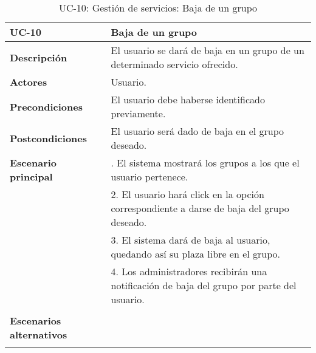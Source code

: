 \begin{table}[H]
  \begin{center}
    \begin{tabularx}{16.4cm}{|l|X|}
      \hline
      \textbf{UC-10} & \textbf{Baja de un grupo}\\
      \hline
      \textbf{Descripción} & El usuario se dará de baja en un grupo de un determinado servicio ofrecido.\\
      \hline
      \textbf{Actores} & Usuario.\\
      \hline
      \textbf{Precondiciones} & El usuario debe haberse identificado previamente.\\
      \hline
      \textbf{Postcondiciones} & El usuario será dado de baja en el grupo deseado.\\
      \hline
      \textbf{Escenario principal} & \smallskip 1. El sistema mostrará los grupos a los que el usuario pertenece.\\
      & 2. El usuario hará click en la opción correspondiente a darse de baja del grupo deseado.\\
      & 3. El sistema dará de baja al usuario, quedando así su plaza libre en el grupo. \\
      & 4. Los administradores recibirán una notificación de baja del grupo por parte del usuario.\\
      & \\
      \hline
      \textbf{Escenarios alternativos} & \\
      & \\
      \hline
    \end{tabularx}
    \caption{UC-10: Gestión de servicios: Baja de un grupo}
  \end{center}
\end{table}


